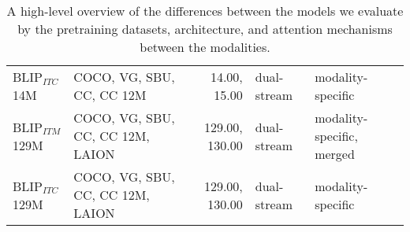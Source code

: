 \begin{table}[ht]
\begin{adjustbox}{max width=\textwidth}
\begin{tabular}{l|lr|l|l}
    BLIP$_{ITC}$ 14M \cite{li2022blip} &  COCO, VG, SBU, CC, CC 12M & 14.00, 15.00 &   dual-stream &         modality-specific \\
    BLIP$_{ITM}$ 129M \cite{li2022blip} & COCO, VG, SBU, CC, CC 12M, LAION & 129.00,   130.00 &   dual-stream & modality-specific, merged \\
    BLIP$_{ITC}$ 129M \cite{li2022blip} & COCO, VG, SBU, CC, CC 12M, LAION & 129.00,   130.00 &   dual-stream &         modality-specific \\
    \bottomrule
    \end{tabular}
    \end{adjustbox}
    \caption{A high-level overview of the differences between the models we evaluate by the pretraining datasets, architecture, and attention mechanisms between the modalities.}
    \label{tab:model-types}
\end{table}